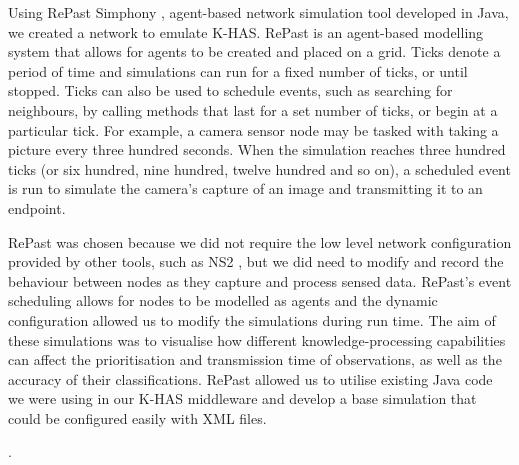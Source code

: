 \DIFdelend \DIFaddbegin \label{sim:env}
\DIFaddend Using RePast Simphony \cite{Collier2003}, \DIFdelbegin {}\DIFdelend \DIFaddbegin {}\DIFaddend agent-based network simulation tool developed in Java, we created a network to emulate K-HAS. RePast is an agent-based modelling system that allows for agents to be created and placed on a grid. Ticks denote a period of time and simulations can run for a fixed number of ticks, or until stopped. Ticks can also be used to schedule events, such as searching for neighbours, by calling methods that last for a set number of ticks, or begin at a particular tick. For example, a camera sensor node may be tasked with taking a picture every three hundred seconds. When the simulation reaches three hundred ticks (or six hundred, nine hundred, twelve hundred and so on), a scheduled event is run to simulate the camera's capture of an image and transmitting it to an endpoint.

RePast was chosen because we did not require the low level network configuration provided by other tools, such as NS2 \cite{mccanne1997network}, but we did need to modify and record the behaviour between nodes as they capture and process sensed data. RePast's event scheduling allows for nodes to be modelled as agents and the dynamic configuration allowed us to modify the simulations during run time. The aim of these simulations was to visualise how different knowledge-processing capabilities can affect the prioritisation and transmission time of observations, as well as the accuracy of their classifications. RePast allowed us to utilise existing Java code we were using in our K-HAS middleware and develop a base simulation that could be configured easily with XML files.

\DIFdelbegin {}%

\DIFdelend \DIFaddbegin {}\DIFaddend .

